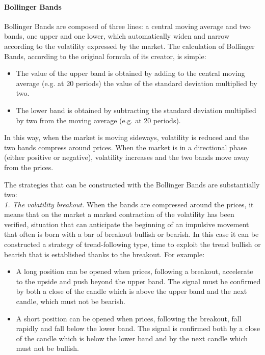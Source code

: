 \paragraph{\textbf{Bollinger Bands}}\mbox{}

Bollinger Bands are composed of three lines: a central moving average and two bands, one upper and one lower, which automatically widen and narrow according to the volatility expressed by the market. The calculation of Bollinger Bands, according to the original formula of its creator, is simple: 

\begin{itemize}
\setlength\itemsep{0.3em}
\item The value of the upper band is obtained by adding to the central moving average (e.g. at 20 periods) the value of the standard deviation multiplied by two. 
\item The lower band is obtained by subtracting the standard deviation multiplied by two from the moving average (e.g. at 20 periods). 
\end{itemize} 

In this way, when the market is moving sideways, volatility is reduced and the two bands compress around prices. When the market is in a directional phase (either positive or negative), volatility increases and the two bands move away from the prices.

The strategies that can be constructed with the Bollinger Bands are substantially two:\\

\noindent\textit{1. The volatility breakout.} When the bands are compressed around the prices, it means that on the market a marked contraction of the volatility has been verified, situation that can anticipate the beginning of an impulsive movement that often is born with a bar of breakout bullish or bearish. In this case it can be constructed a strategy of trend-following type, time to exploit the trend bullish or bearish that is established thanks to the breakout. For example:

\begin{itemize}
\setlength\itemsep{0.3em}
\item A long position can be opened when prices, following a breakout, accelerate to the upside and push beyond the upper band. The signal must be confirmed by both a close of the candle which is above the upper band and the next candle, which must not be bearish.
\item A short position can be opened when prices, following the breakout, fall rapidly and fall below the lower band. The signal is confirmed both by a close of the candle which is below the lower band and by the next candle which must not be bullish. 
\end{itemize} 

